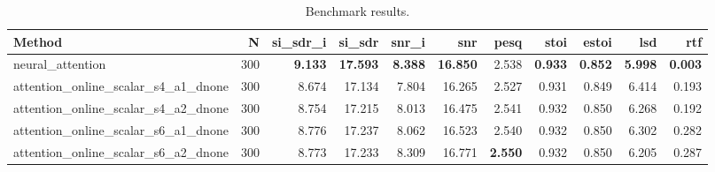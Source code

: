 \begin{table}[t]
\centering
\caption{Benchmark results.}
\label{tab:bench}
\begin{tabular}{lrrrrrrrrrr}
\toprule
Method & N & si\_sdr\_i & si\_sdr & snr\_i & snr & pesq & stoi & estoi & lsd & rtf \\
\midrule
neural_attention & 300 & \textbf{9.133} & \textbf{17.593} & \textbf{8.388} & \textbf{16.850} & 2.538 & \textbf{0.933} & \textbf{0.852} & \textbf{5.998} & \textbf{0.003} \\
attention_online_scalar_s4_a1_dnone & 300 & 8.674 & 17.134 & 7.804 & 16.265 & 2.527 & 0.931 & 0.849 & 6.414 & 0.193 \\
attention_online_scalar_s4_a2_dnone & 300 & 8.754 & 17.215 & 8.013 & 16.475 & 2.541 & 0.932 & 0.850 & 6.268 & 0.192 \\
attention_online_scalar_s6_a1_dnone & 300 & 8.776 & 17.237 & 8.062 & 16.523 & 2.540 & 0.932 & 0.850 & 6.302 & 0.282 \\
attention_online_scalar_s6_a2_dnone & 300 & 8.773 & 17.233 & 8.309 & 16.771 & \textbf{2.550} & 0.932 & 0.850 & 6.205 & 0.287 \\
\bottomrule
\end{tabular}
\end{table}